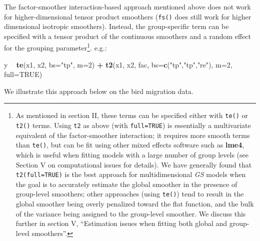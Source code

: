 \documentclass[12pt]{article}
\newenvironment{Shaded}{\begin{snugshade}}{\end{snugshade}}
\newcommand{\KeywordTok}[1]{\textcolor[rgb]{0.13,0.29,0.53}{\textbf{#1}}}
\newcommand{\DataTypeTok}[1]{\textcolor[rgb]{0.13,0.29,0.53}{#1}}
\newcommand{\DecValTok}[1]{\textcolor[rgb]{0.00,0.00,0.81}{#1}}
\newcommand{\StringTok}[1]{\textcolor[rgb]{0.31,0.60,0.02}{#1}}
\newcommand{\OtherTok}[1]{\textcolor[rgb]{0.56,0.35,0.01}{#1}}
\newcommand{\OperatorTok}[1]{\textcolor[rgb]{0.81,0.36,0.00}{\textbf{#1}}}
\newcommand{\NormalTok}[1]{#1}
\let\rmarkdownfootnote\footnote%
\def\footnote{\protect\rmarkdownfootnote}
\begin{document}
The factor-smoother interaction-based approach mentioned above does not
work for higher-dimensional tensor product smoothers (\texttt{fs()} does
still work for higher dimensional isotropic smoothers). Instead, the
group-specific term can be specified with a tensor product of the
continuous smoothers and a random effect for the grouping
parameter\footnote{As mentioned in section II, these terms can be
  specified either with \texttt{te()} or \texttt{t2()} terms. Using
  \texttt{t2} as above (with \texttt{full=TRUE}) is essentially a
  multivariate equivalent of the factor-smoother interaction; it
  requires more smooth terms than \texttt{te()}, but can be fit using
  other mixed effects software such as \textbf{lme4}, which is useful
  when fitting models with a large number of group levels (see Section V
  on computational issues for details). We have generally found that
  \texttt{t2(full=TRUE)} is the best approach for multidimensional
  \emph{GS} models when the goal is to accurately estimate the global
  smoother in the presence of group-level smoothers; other approaches
  (using \texttt{te()}) tend to result in the global smoother being
  overly penalized toward the flat function, and the bulk of the
  variance being assigned to the group-level smoother. We discuss this
  further in section V, ``Estimation issues when fitting both global and
  group-level smoothers''.}. e.g.:

\begin{Shaded}
\begin{Highlighting}[]
\NormalTok{y }\OperatorTok{~}\StringTok{ }\KeywordTok{te}\NormalTok{(x1, x2, }\DataTypeTok{bs=}\StringTok{"tp"}\NormalTok{, }\DataTypeTok{m=}\DecValTok{2}\NormalTok{) }\OperatorTok{+}
\StringTok{    }\KeywordTok{t2}\NormalTok{(x1, x2, fac, }\DataTypeTok{bs=}\KeywordTok{c}\NormalTok{(}\StringTok{"tp"}\NormalTok{,}\StringTok{"tp"}\NormalTok{,}\StringTok{"re"}\NormalTok{), }\DataTypeTok{m=}\DecValTok{2}\NormalTok{, }\DataTypeTok{full=}\OtherTok{TRUE}\NormalTok{)}
\end{Highlighting}
\end{Shaded}

We illustrate this approach below on the bird migration data.
\end{document}
